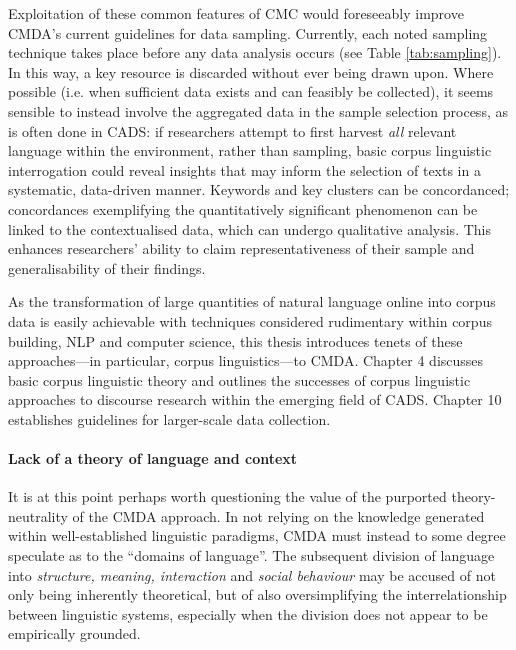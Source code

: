 			Exploitation of these common features of CMC would foreseeably improve CMDA's current guidelines for data sampling. Currently, each noted sampling technique takes place before any data analysis occurs (see Table \ref{tab:sampling}). In this way, a key resource is discarded without ever being drawn upon. Where possible (i.e. when sufficient data exists and can feasibly be collected), it seems sensible to instead involve the aggregated data in the sample selection process, as is often done in CADS: if researchers attempt to first harvest \emph{all} relevant language within the environment, rather than sampling, basic corpus linguistic interrogation could reveal insights that may inform the selection of texts in a systematic, data-driven manner. Keywords and key clusters can be concordanced; concordances exemplifying the quantitatively significant phenomenon can be linked to the contextualised data, which can undergo qualitative analysis. This enhances researchers' ability to claim representativeness of their sample and generalisability of their findings.

			As the transformation of large quantities of natural language online into corpus data is easily achievable with techniques considered rudimentary within corpus building, NLP and computer science, this thesis introduces tenets of these approaches---in particular, corpus linguistics---to CMDA. Chapter 4 discusses basic corpus linguistic theory and outlines the successes of corpus linguistic approaches to discourse research within the emerging field of CADS. Chapter 10 establishes guidelines for larger-scale data collection.

		 \paragraph{Lack of a theory of language and context}\label{sect:shortsfl}

			It is at this point perhaps worth questioning the value of the purported theory-neutrality of the CMDA approach. In not relying on the knowledge generated within well-established linguistic paradigms, CMDA must instead to some degree speculate as to the ``domains of language''. The subsequent division of language into \emph{structure, meaning, interaction} and \emph{social behaviour} may be accused of not only being inherently theoretical, but of also oversimplifying the interrelationship between linguistic systems, especially when the division does not appear to be empirically grounded.

